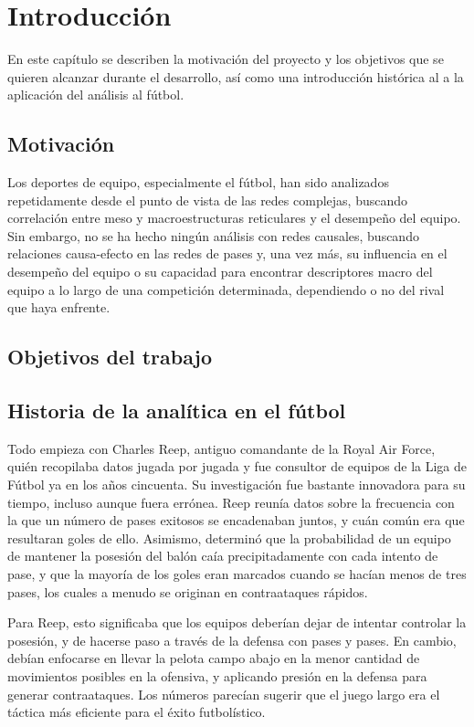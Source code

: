 \chapter{Introducción}

En este capítulo se describen la motivación del proyecto y los objetivos que
se quieren alcanzar durante el desarrollo, así como una introducción histórica al
a la aplicación del análisis al fútbol. 

\section{Motivación}

Los deportes de equipo, especialmente el fútbol, han sido analizados 
repetidamente desde el punto de vista de las redes complejas, buscando 
correlación entre meso y macroestructuras reticulares y el desempeño del 
equipo. Sin embargo, no se ha hecho ningún análisis con redes causales, 
buscando relaciones causa-efecto en las redes de pases y, una vez más, 
su influencia en el desempeño del equipo o su capacidad para encontrar 
descriptores macro del equipo a lo largo de una competición determinada, 
dependiendo o no del rival que haya enfrente.

\section{Objetivos del trabajo} \label{sect:goals}


\section{Historia de la analítica en el fútbol}

Todo empieza con Charles Reep, antiguo comandante de la Royal Air Force, quién
recopilaba datos jugada por jugada y fue consultor de equipos de la Liga de 
Fútbol ya en los años cincuenta. Su investigación fue bastante innovadora para 
su tiempo, incluso aunque fuera errónea. Reep reunía datos sobre la frecuencia 
con la que un número de pases exitosos se encadenaban juntos, y cuán común era 
que resultaran goles de ello. Asimismo, determinó que la probabilidad de un 
equipo de mantener la posesión del balón caía precipitadamente con cada intento 
de pase, y que la mayoría de los goles eran marcados cuando se hacían menos de 
tres pases, los cuales a menudo se originan en contraataques rápidos.

Para Reep, esto significaba que los equipos deberían dejar de intentar controlar la posesión,
y de hacerse paso a través de la defensa con pases y pases. En cambio,
debían enfocarse en llevar la pelota campo abajo en la menor cantidad de movimientos posibles
en la ofensiva, y aplicando presión en la defensa para generar
contraataques. Los números parecían sugerir que el juego largo era el
táctica más eficiente para el éxito futbolístico.

